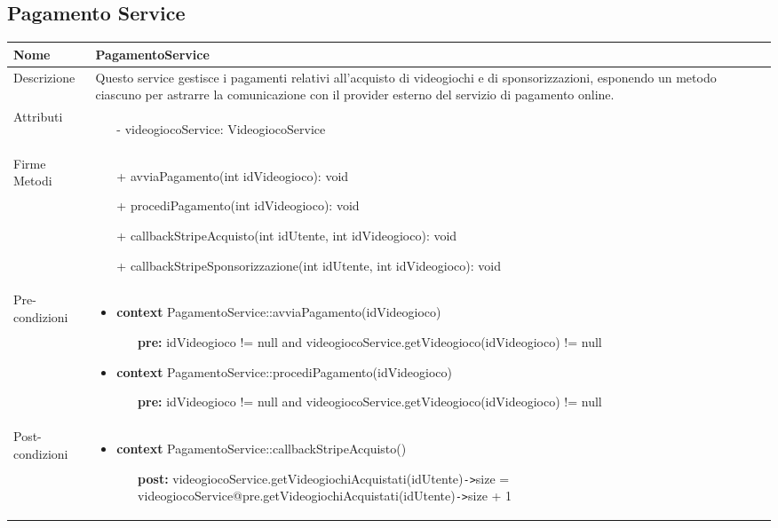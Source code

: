 \newpage
\subsection{Pagamento Service}
\small\begin{tabular}{|| l | p{28em} ||} 
	\hline
	Nome & PagamentoService\\
	\hline
	Descrizione & Questo service gestisce i pagamenti relativi all'acquisto di videogiochi e di sponsorizzazioni, esponendo un metodo ciascuno per astrarre la comunicazione con il provider esterno del servizio di pagamento online. \\
	\hline
	Attributi & \begin{itemize}
		\item[-] videogiocoService: VideogiocoService
	\end{itemize}\\
	\hline
	Firme Metodi & \begin{itemize}
		\item[+] avviaPagamento(int idVideogioco): void 
		\item[+] procediPagamento(int idVideogioco): void
		\item[+] callbackStripeAcquisto(int idUtente, int idVideogioco): void  
		\item[+] callbackStripeSponsorizzazione(int idUtente, int idVideogioco): void
	\end{itemize}\\
	\hline
	Pre-condizioni & \begin{itemize}[leftmargin=*]
		\item \textbf{context} PagamentoService::avviaPagamento(idVideogioco)
		\begin{itemize}
			\item[ ] \textbf{pre:} idVideogioco != null and videogiocoService.getVideogioco(idVideogioco) != null
		\end{itemize}

		\item \textbf{context} PagamentoService::procediPagamento(idVideogioco)
		\begin{itemize}
			\item[ ] \textbf{pre:} idVideogioco != null and videogiocoService.getVideogioco(idVideogioco) != null
		\end{itemize}
	\end{itemize}\\
	\hline
	Post-condizioni & \begin{itemize}[leftmargin=*]
		\item \textbf{context} PagamentoService::callbackStripeAcquisto()
		\begin{itemize}
			\item[ ] \textbf{post:} videogiocoService.getVideogiochiAcquistati(idUtente)\verb|->|size = videogiocoService@pre.getVideogiochiAcquistati(idUtente)\verb|->|size + 1
		\end{itemize}


\end{itemize}
\end{tabular}
